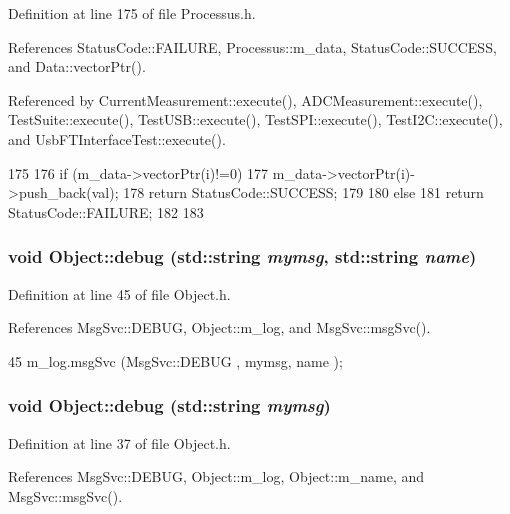 Definition at line 175 of file Processus.h.

References StatusCode::FAILURE, Processus::m\_\-data, StatusCode::SUCCESS, and Data::vectorPtr().

Referenced by CurrentMeasurement::execute(), ADCMeasurement::execute(), TestSuite::execute(), TestUSB::execute(), TestSPI::execute(), TestI2C::execute(), and UsbFTInterfaceTest::execute().


\begin{DoxyCode}
175                                         {
176     if (m_data->vectorPtr(i)!=0){
177       m_data->vectorPtr(i)->push_back(val);
178       return StatusCode::SUCCESS;
179     }
180     else {
181       return StatusCode::FAILURE;
182     }
183   }
\end{DoxyCode}
\hypertarget{classObject_a6c9a0397ca804e04d675ed05683f5420}{
\subsubsection[{debug}]{\setlength{\rightskip}{0pt plus 5cm}void Object::debug (std::string {\em mymsg}, \/  std::string {\em name})}}
\label{classObject_a6c9a0397ca804e04d675ed05683f5420}


Definition at line 45 of file Object.h.

References MsgSvc::DEBUG, Object::m\_\-log, and MsgSvc::msgSvc().


\begin{DoxyCode}
45 { m_log.msgSvc (MsgSvc::DEBUG   , mymsg, name ); }
\end{DoxyCode}
\hypertarget{classObject_aac010553f022165573714b7014a15f0d}{
\subsubsection[{debug}]{\setlength{\rightskip}{0pt plus 5cm}void Object::debug (std::string {\em mymsg})}}
\label{classObject_aac010553f022165573714b7014a15f0d}


Definition at line 37 of file Object.h.

References MsgSvc::DEBUG, Object::m\_\-log, Object::m\_\-name, and MsgSvc::msgSvc().

